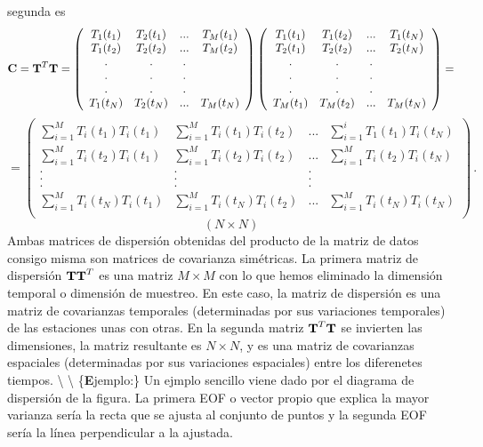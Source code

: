 \documentclass[
]{agujournal2019}
\begin{document}
segunda es \[{\textbf C}={\textbf T}^T{\textbf T}=
\left(\begin{array}{cccc}
   T_{1}(t_1) & T_{2}(t_1) & ... & T_{M}(t_1)\\
   T_{1}(t_2) & T_{2}(t_2) & ... & T_{M}(t_2)\\
                . & . & . \\
        . & . & . \\
        . & . & . \\
   T_{1}(t_N) & T_{2}(t_N) & ... & T_{M}(t_N)\\
        \end{array}\right)\left(\begin{array}{cccc}
   T_{1}(t_1) & T_{1}(t_2) & ... & T_{1}(t_N)\\
   T_{2}(t_1) & T_{2}(t_2) & ... & T_{2}(t_N)\\
                . & . & . \\
        . & . & . \\
        . & . & . \\
   T_{M}(t_1) & T_{M}(t_2) & ... & T_{M}(t_N)\\
        \end{array}\right)=\] \[=\left(\begin{array}{cccc}
   \sum\limits_{i=1}^M{T_{i}(t_1)T_{i}(t_1)} & \sum\limits_{i=1}^M{T_{i}(t_1)T_{i}(t_2)} & ... & \sum\limits_{i=1}^i{T_{1}(t_1)T_{i}(t_N)}\\
   \sum\limits_{i=1}^M{T_{i}(t_2)T_{i}(t_1)} & \sum\limits_{i=1}^M{T_{i}(t_2)T_{i}(t_2)} & ... & \sum\limits_{i=1}^M{T_{i}(t_2)T_{i}(t_N)}\\
                . & . & . \\
        . & . & . \\
        . & . & . \\
   \sum\limits_{i=1}^M{T_{i}(t_N)T_{i}(t_1)} & \sum\limits_{i=1}^M{T_{i}(t_N)T_{i}(t_2)} & ... & \sum\limits_{i=1}^M{T_{i}(t_N)T_{i}(t_N)}\\
        \end{array}\right)\,.\] \[\left( N \times N \right)\] Ambas
matrices de dispersión obtenidas del producto de la matriz de datos
consigo misma son matrices de covarianza simétricas. La primera matriz
de dispersión \({\textbf T}{\textbf T}^T\) es una matriz \(M \times M\)
con lo que hemos eliminado la dimensión temporal o dimensión de
muestreo. En este caso, la matriz de dispersión es una matriz de
covarianzas temporales (determinadas por sus variaciones temporales) de
las estaciones unas con otras. En la segunda matriz
\({\textbf T}^T{\textbf T}\) se invierten las dimensiones, la matriz
resultante es \(N\times N\), y es una matriz de covarianzas espaciales
(determinadas por sus variaciones espaciales) entre los diferenetes
tiempos. \textbackslash{} \textbackslash{} \{\textbf Ejemplo:\} Un
ejmplo sencillo viene dado por el diagrama de dispersión de la figura.
La primera EOF o vector propio que explica la mayor varianza sería la
recta que se ajusta al conjunto de puntos y la segunda EOF sería la
línea perpendicular a la ajustada.
\end{document}
